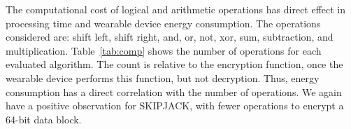 
The computational cost of logical and arithmetic operations has direct effect in processing time and wearable device energy consumption. The operations considered are: shift left, shift right, and, or, not, xor, sum, subtraction, and multiplication. Table~\ref{tab:comp} shows the number of operations for each evaluated algorithm. The count is relative to the encryption function, once the wearable device performs this function, but not decryption. %
Thus, energy consumption has a direct correlation with the number of operations. We again have a positive observation for SKIPJACK, with fewer operations to encrypt a 64-bit data block. %


